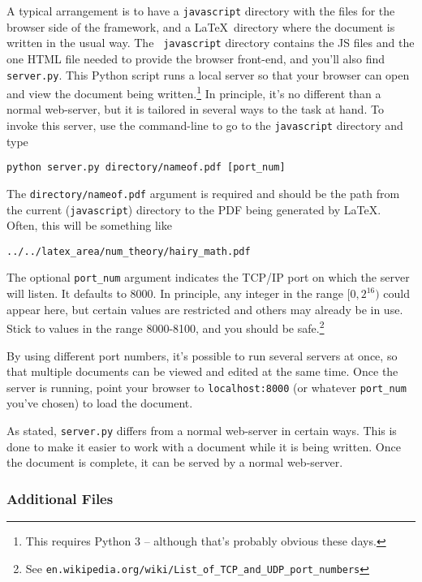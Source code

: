 \documentclass[10pt]{article}
\begin{document}
A typical arrangement is to have a {\tt javascript}
directory with the files for the browser side of the framework, and a
\LaTeX\ directory where the document is written in the usual way. The {\tt 
  javascript} directory contains the JS files and the one HTML file needed
to provide the browser front-end, and you'll also find {\tt server.py}.
This Python script runs a local server so that your browser can
open and view the document being written.\footnote{This requires
Python 3 -- although that's probably obvious these days.} In principle, it's no
different than a normal web-server, but it is tailored in several
ways to the task at hand. To invoke this server, use the command-line
to go to the {\tt javascript} directory and type
\begin{verbatim}
python server.py directory/nameof.pdf [port_num]
\end{verbatim}
The {\tt directory/nameof.pdf} argument is required and should be the
path from the current ({\tt javascript}) directory to the PDF being
generated by \LaTeX. Often, this will be something like
\begin{verbatim}
../../latex_area/num_theory/hairy_math.pdf
\end{verbatim}
The optional \verb=port_num= argument indicates the TCP/IP port on which the
server will listen. It defaults to 8000. In principle, any integer in
the range $[0,2^{16})$ could appear here, but certain values are
restricted and others may already be in use. Stick to values
in the range 8000-8100, and you should be safe.\footnote{See
\verb=en.wikipedia.org/wiki/List_of_TCP_and_UDP_port_numbers=}

By using different port numbers, it's possible to run several servers
at once, so that multiple documents can be viewed and edited at the
same time. Once the server is running, point your browser to
\verb=localhost:8000= (or whatever \verb=port_num= you've chosen) to
load the document.

As stated, {\tt server.py} differs from a normal web-server in certain
ways. This is done to make it easier to work with a document while it
is being written. Once the document is complete, it can be served by a
normal web-server.

\subsubsection*{Additional Files}
\end{document}
